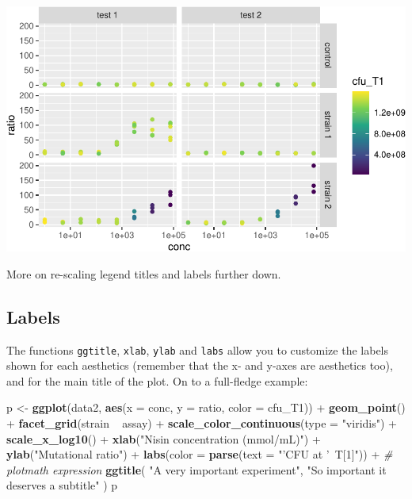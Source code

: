 \documentclass[]{book}
\newenvironment{Shaded}{}{}
\newcommand{\CommentTok}[1]{\textcolor[rgb]{0.38,0.63,0.69}{\textit{#1}}}
\newcommand{\DataTypeTok}[1]{\textcolor[rgb]{0.56,0.13,0.00}{#1}}
\newcommand{\KeywordTok}[1]{\textcolor[rgb]{0.00,0.44,0.13}{\textbf{#1}}}
\newcommand{\NormalTok}[1]{#1}
\newcommand{\OperatorTok}[1]{\textcolor[rgb]{0.40,0.40,0.40}{#1}}
\newcommand{\StringTok}[1]{\textcolor[rgb]{0.25,0.44,0.63}{#1}}
\begin{document}
\begin{center}\includegraphics[width=\textwidth]{TRES-Tidy-Tutorial_files/figure-latex/unnamed-chunk-142-1} \end{center}

More on re-scaling legend titles and labels further down.

\hypertarget{labels}{%
\subsection{Labels}\label{labels}}

The functions \texttt{ggtitle}, \texttt{xlab}, \texttt{ylab} and \texttt{labs} allow you to customize the labels shown for each aesthetics (remember that the x- and y-axes are aesthetics too), and for the main title of the plot. On to a full-fledge example:

\begin{Shaded}
\begin{Highlighting}[]
\NormalTok{p <-}\StringTok{ }\KeywordTok{ggplot}\NormalTok{(data2, }\KeywordTok{aes}\NormalTok{(}\DataTypeTok{x =}\NormalTok{ conc, }\DataTypeTok{y =}\NormalTok{ ratio, }\DataTypeTok{color =}\NormalTok{ cfu_T1)) }\OperatorTok{+}
\StringTok{  }\KeywordTok{geom_point}\NormalTok{() }\OperatorTok{+}
\StringTok{  }\KeywordTok{facet_grid}\NormalTok{(strain }\OperatorTok{~}\StringTok{ }\NormalTok{assay) }\OperatorTok{+}
\StringTok{  }\KeywordTok{scale_color_continuous}\NormalTok{(}\DataTypeTok{type =} \StringTok{"viridis"}\NormalTok{) }\OperatorTok{+}
\StringTok{  }\KeywordTok{scale_x_log10}\NormalTok{() }\OperatorTok{+}
\StringTok{  }\KeywordTok{xlab}\NormalTok{(}\StringTok{"Nisin concentration (mmol/mL)"}\NormalTok{) }\OperatorTok{+}
\StringTok{  }\KeywordTok{ylab}\NormalTok{(}\StringTok{"Mutational ratio"}\NormalTok{) }\OperatorTok{+}
\StringTok{  }\KeywordTok{labs}\NormalTok{(}\DataTypeTok{color =} \KeywordTok{parse}\NormalTok{(}\DataTypeTok{text =} \StringTok{"'CFU at '~T[1]"}\NormalTok{)) }\OperatorTok{+}\StringTok{ }\CommentTok{# plotmath expression}
\StringTok{  }\KeywordTok{ggtitle}\NormalTok{(}
    \StringTok{"A very important experiment"}\NormalTok{,}
    \StringTok{"So important it deserves a subtitle"}
\NormalTok{  )}
\NormalTok{p}
\end{Highlighting}
\end{Shaded}
\end{document}
